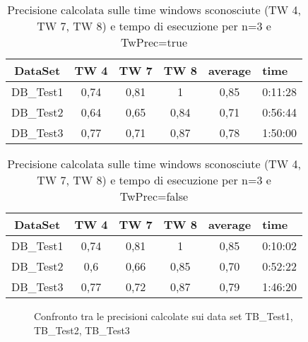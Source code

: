 \begin{table}[H]
	\centering
	\footnotesize
	\begin{tabular}{|cccccp{}|}
	\hline
	\textbf{DataSet} & \textbf{TW 4} & \textbf{ TW 7} & \textbf{TW 8} & \textbf{average} & \textbf{time}\\
	\hline 
	DB\_Test1 & 0,74 & 0,81 & 1 & 0,85 & 0:11:28\\ 
	DB\_Test2 & 0,64 & 0,65 & 0,84 & 0,71 & 0:56:44\\ 
	DB\_Test3 & 0,77 & 0,71 & 0,87 & 0,78 & 1:50:00\\ 
	\hline 
	\end{tabular}
	\caption{Precisione calcolata sulle time windows sconosciute (TW 4, TW 7, TW 8) e tempo di esecuzione per n=3 e TwPrec=true}
\end{table}
\begin{table}[H]
	\centering
	\footnotesize
	\begin{tabular}{|cccccp{}|}
	\hline
	\textbf{DataSet} & \textbf{TW 4} & \textbf{ TW 7} & \textbf{TW 8} & \textbf{average} & \textbf{time}\\
	\hline 
	DB\_Test1 & 0,74 & 0,81 & 1 & 0,85 & 0:10:02\\ 
	DB\_Test2 & 0,6 & 0,66 & 0,85 & 0,70 & 0:52:22\\ 
	DB\_Test3 & 0,77 & 0,72 & 0,87 & 0,79 & 1:46:20\\ 
	\hline 
	\end{tabular}
	\caption{Precisione calcolata sulle time windows sconosciute (TW 4, TW 7, TW 8) e tempo di esecuzione per n=3 e TwPrec=false}
\end{table}

\begin{figure}
\centering
{}\qquad
{}
\qquad
{}
\caption{Confronto tra le precisioni calcolate sui data set TB\_Test1, TB\_Test2, TB\_Test3}
\end{figure}

